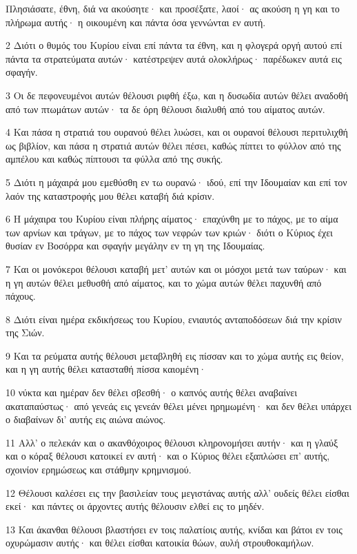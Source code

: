 \par Πλησιάσατε, έθνη, διά να ακούσητε· και προσέξατε, λαοί· ας ακούση η γη και το πλήρωμα αυτής· η οικουμένη και πάντα όσα γεννώνται εν αυτή.
\par 2 Διότι ο θυμός του Κυρίου είναι επί πάντα τα έθνη, και η φλογερά οργή αυτού επί πάντα τα στρατεύματα αυτών· κατέστρεψεν αυτά ολοκλήρως· παρέδωκεν αυτά εις σφαγήν.
\par 3 Οι δε πεφονευμένοι αυτών θέλουσι ριφθή έξω, και η δυσωδία αυτών θέλει αναδοθή από των πτωμάτων αυτών· τα δε όρη θέλουσι διαλυθή από του αίματος αυτών.
\par 4 Και πάσα η στρατιά του ουρανού θέλει λυώσει, και οι ουρανοί θέλουσι περιτυλιχθή ως βιβλίον, και πάσα η στρατιά αυτών θέλει πέσει, καθώς πίπτει το φύλλον από της αμπέλου και καθώς πίπτουσι τα φύλλα από της συκής.
\par 5 Διότι η μάχαιρά μου εμεθύσθη εν τω ουρανώ· ιδού, επί την Ιδουμαίαν και επί τον λαόν της καταστροφής μου θέλει καταβή διά κρίσιν.
\par 6 Η μάχαιρα του Κυρίου είναι πλήρης αίματος· επαχύνθη με το πάχος, με το αίμα των αρνίων και τράγων, με το πάχος των νεφρών των κριών· διότι ο Κύριος έχει θυσίαν εν Βοσόρρα και σφαγήν μεγάλην εν τη γη της Ιδουμαίας.
\par 7 Και οι μονόκεροι θέλουσι καταβή μετ' αυτών και οι μόσχοι μετά των ταύρων· και η γη αυτών θέλει μεθυσθή από αίματος, και το χώμα αυτών θέλει παχυνθή από πάχους.
\par 8 Διότι είναι ημέρα εκδικήσεως του Κυρίου, ενιαυτός ανταποδόσεων διά την κρίσιν της Σιών.
\par 9 Και τα ρεύματα αυτής θέλουσι μεταβληθή εις πίσσαν και το χώμα αυτής εις θείον, και η γη αυτής θέλει κατασταθή πίσσα καιομένη·
\par 10 νύκτα και ημέραν δεν θέλει σβεσθή· ο καπνός αυτής θέλει αναβαίνει ακαταπαύστως· από γενεάς εις γενεάν θέλει μένει ηρημωμένη· και δεν θέλει υπάρχει ο διαβαίνων δι' αυτής εις αιώνα αιώνος.
\par 11 Αλλ' ο πελεκάν και ο ακανθόχοιρος θέλουσι κληρονομήσει αυτήν· και η γλαύξ και ο κόραξ θέλουσι κατοικεί εν αυτή· και ο Κύριος θέλει εξαπλώσει επ' αυτής, σχοινίον ερημώσεως και στάθμην κρημνισμού.
\par 12 Θέλουσι καλέσει εις την βασιλείαν τους μεγιστάνας αυτής αλλ' ουδείς θέλει είσθαι εκεί· και πάντες οι άρχοντες αυτής θέλουσιν ελθεί εις το μηδέν.
\par 13 Και άκανθαι θέλουσι βλαστήσει εν τοις παλατίοις αυτής, κνίδαι και βάτοι εν τοις οχυρώμασιν αυτής· και θέλει είσθαι κατοικία θώων, αυλή στρουθοκαμήλων.
